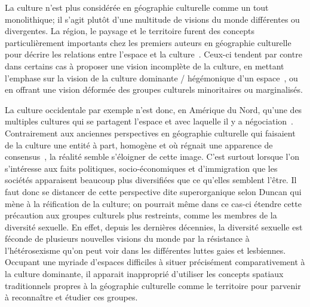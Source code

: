 La culture n'est plus considérée en géographie culturelle comme un tout monolithique; il s'agit plutôt d'une multitude de visions du monde différentes ou divergentes. 
La région, le paysage et le territoire furent des concepts particulièrement importants chez les premiers auteurs en géographie culturelle pour décrire les relations entre l'espace et la culture~\citep{Bonnemaison1981,Monnet1998,DiMeo1998,}. 
Ceux-ci tendent par contre dans certains cas à proposer une vision incomplète de la culture, en mettant l'emphase sur la vision de la culture dominante / hégémonique d'un espace~\citep[11-12]{Duncan1993}, ou en offrant une vision déformée des groupes culturels minoritaires ou marginalisés.

La culture occidentale par exemple n'est donc, en Amérique du Nord, qu'une des multiples cultures qui se partagent l'espace et avec laquelle il y a négociation~\citep[11]{Duncan1993}. 
Contrairement aux anciennes perspectives en géographie culturelle qui faisaient de la culture une entité à part, homogène et où régnait une apparence de consensus~\citep{Duncan1980}, la réalité semble s'éloigner de cette image. 
C'est surtout lorsque l'on s'intéresse aux faits politiques, socio-économiques et d'immigration que les sociétés apparaisent beaucoup plus diversifiées que ce qu'elles semblent l'être. 
Il faut donc se distancer de cette perspective dite superorganique selon Duncan qui mène à la réification de la culture; on pourrait même dans ce cas-ci étendre cette précaution aux groupes culturels plus restreints, comme les membres de la diversité sexuelle. 
En effet, depuis les dernières décennies, la diversité sexuelle est féconde de plusieurs nouvelles visions du monde par la résistance à l'hétérosexisme qu'on peut voir dans les différentes luttes gaies et lesbiennes.
Occupant une myriade d'espaces difficiles à situer précisément comparativement à la culture dominante, il apparait inapproprié d'utiliser les concepts spatiaux traditionnels propres à la géographie culturelle comme le territoire pour parvenir à reconnaître et étudier ces groupes.

